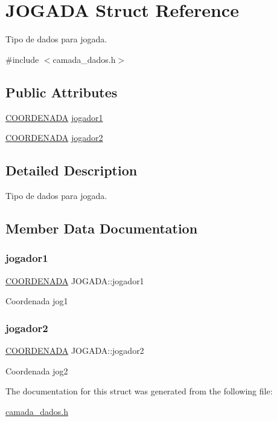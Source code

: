 \hypertarget{struct_j_o_g_a_d_a}{}\section{J\+O\+G\+A\+DA Struct Reference}
\label{struct_j_o_g_a_d_a}


Tipo de dados para jogada.  




{\ttfamily \#include $<$camada\+\_\+dados.\+h$>$}

\subsection*{Public Attributes}
\begin{DoxyCompactItemize}
\item 
\hyperlink{struct_c_o_o_r_d_e_n_a_d_a}{C\+O\+O\+R\+D\+E\+N\+A\+DA} \hyperlink{struct_j_o_g_a_d_a_a93d9306cb0c49b66b7d9a615bffe0149}{jogador1}
\item 
\hyperlink{struct_c_o_o_r_d_e_n_a_d_a}{C\+O\+O\+R\+D\+E\+N\+A\+DA} \hyperlink{struct_j_o_g_a_d_a_ab46b16dfbdc7f2af9430c8dcdac0914b}{jogador2}
\end{DoxyCompactItemize}


\subsection{Detailed Description}
Tipo de dados para jogada. 

\subsection{Member Data Documentation}
\mbox{\label{struct_j_o_g_a_d_a_a93d9306cb0c49b66b7d9a615bffe0149}} 
\subsubsection{\texorpdfstring{jogador1}{jogador1}}
{\footnotesize\ttfamily \hyperlink{struct_c_o_o_r_d_e_n_a_d_a}{C\+O\+O\+R\+D\+E\+N\+A\+DA} J\+O\+G\+A\+D\+A\+::jogador1}

Coordenada jog1 \mbox{\label{struct_j_o_g_a_d_a_ab46b16dfbdc7f2af9430c8dcdac0914b}} 
\subsubsection{\texorpdfstring{jogador2}{jogador2}}
{\footnotesize\ttfamily \hyperlink{struct_c_o_o_r_d_e_n_a_d_a}{C\+O\+O\+R\+D\+E\+N\+A\+DA} J\+O\+G\+A\+D\+A\+::jogador2}

Coordenada jog2 

The documentation for this struct was generated from the following file\+:\begin{DoxyCompactItemize}
\item 
\hyperlink{camada__dados_8h}{camada\+\_\+dados.\+h}\end{DoxyCompactItemize}
